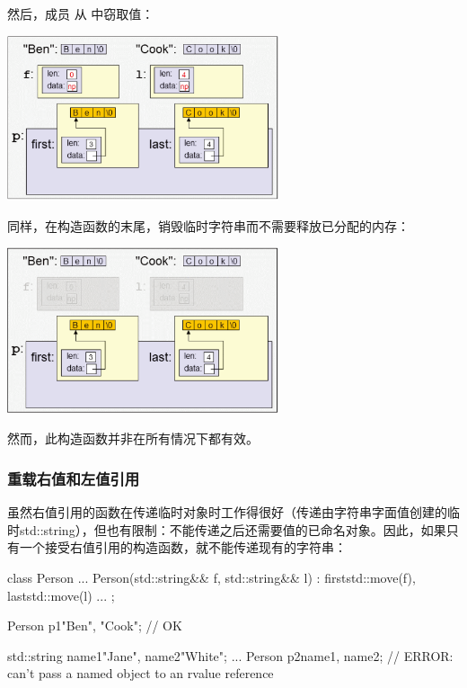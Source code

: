 然后，成员  从  中窃取值：

\begin{center}
	\includegraphics[width=0.6\textwidth]{part1/ch4/images/10}
\end{center}

同样，在构造函数的末尾，销毁临时字符串而不需要释放已分配的内存：

\begin{center}
	\includegraphics[width=0.6\textwidth]{part1/ch4/images/11}
\end{center}

然而，此构造函数并非在所有情况下都有效。

\subsubsection{重载右值和左值引用}

虽然右值引用的函数在传递临时对象时工作得很好（传递由字符串字面值创建的临时std::string），但也有限制：不能传递之后还需要值的已命名对象。因此，如果只有一个接受右值引用的构造函数，就不能传递现有的字符串：

\begin{cppcode}
class Person {
	...
	Person(std::string&& f, std::string&& l)
	: first{std::move(f)}, last{std::move(l)} {
	}
	...
};

Person p1{"Ben", "Cook"}; // OK

std::string name1{"Jane"}, name2{"White"};
...
Person p2{name1, name2}; // ERROR: can’t pass a named object to an rvalue reference
\end{cppcode}

